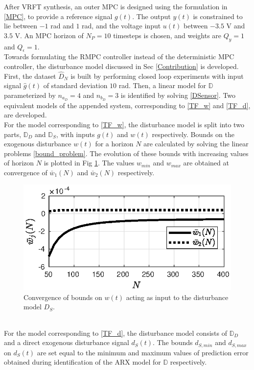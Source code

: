 \documentclass[letterpaper, 10 pt, conference]{ieeeconf}  %
\begin{document}
	After VRFT synthesis, an outer MPC is designed using the formulation in \eqref{MPC}, to provide a reference signal $g(t)$. The output $y(t)$ is constrained to lie between $-1$ rad and $1$ rad, and the voltage input $u(t)$ between $-3.5$ V and $3.5$ V. An MPC horizon of $N_P=10$ timesteps is chosen, and weights are $Q_y=1$ and $Q_{\epsilon}=1$. \\
	Towards formulating the RMPC controller instead of the deterministic MPC controller, the disturbance model discussed in Sec \ref{Contribution} is developed. First, the dataset $\hat{D}_N$ is built by performing closed loop experiments with input signal $\hat{g}(t)$ of standard deviation $10$ rad. Then, a linear model for $\mathbb{D}$ parameterized by $n_{a_D} = 4$ and $n_{b_D} = 3$ is identified by solving \eqref{DSensor}. Two equivalent models of the appended system, corresponding to \eqref{TF_w} and \eqref{TF_d}, are developed.  \\ 
	\indent For the model corresponding to \eqref{TF_w}, the disturbance model is split into two parts, $\mathbb{D}_D$ and $\mathbb{D}_S$, with inputs $g(t)$ and $w(t)$ respectively. Bounds on the exogenous disturbance $w(t)$ for a horizon $N$ are calculated by solving the linear problems \eqref{bound_problem}. The evolution of these bounds with increasing values of horizon $N$ is plotted in Fig \ref{bounds_RG}.  The values $w_{min}$ and $w_{max}$ are obtained at convergence of  $\bar{w}_1(N)$ and $\bar{w}_2(N)$ respectively.
	\begin{figure}[h]
		\hspace{0pt}
		\includegraphics[scale = 0.75]{bounds_RG.eps}
		\caption{Convergence of bounds on $w(t)$ acting as input to the disturbance model $D_S$.}
		\label{bounds_RG}
	\end{figure} \\
	For the model corresponding to \eqref{TF_d}, the disturbance model consists of $\mathbb{D}_D$ and a direct exogenous disturbance signal $d_S(t)$. The bounds $d_{S,min}$ and $d_{S,max}$ on $d_S(t)$ are set equal to the minimum and maximum values of prediction error obtained during identification of the ARX model for $\mathbb{D}$ respectively. \vspace{5pt} \\
\end{document}
